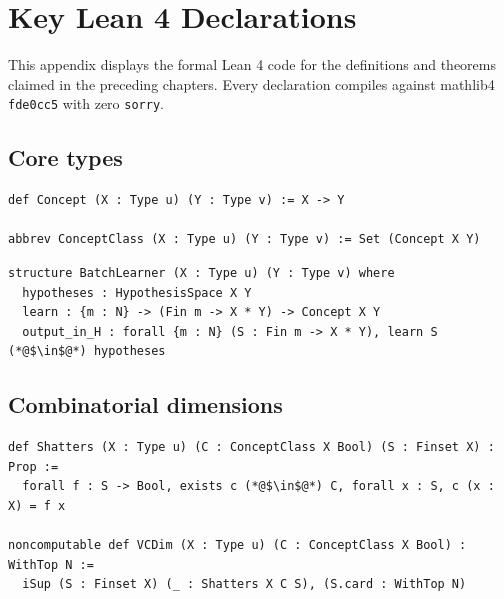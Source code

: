 %

\chapter{Key Lean 4 Declarations}\label{app:lean-code}

This appendix displays the formal Lean 4 code for the definitions and
theorems claimed in the preceding chapters. Every declaration compiles
against mathlib4 \texttt{fde0cc5} with zero \texttt{sorry}.

\section{Core types}

\begin{lstlisting}[caption={Concept and ConceptClass (Basic.lean)}]
def Concept (X : Type u) (Y : Type v) := X -> Y

abbrev ConceptClass (X : Type u) (Y : Type v) := Set (Concept X Y)
\end{lstlisting}

\begin{lstlisting}[caption={BatchLearner (Learner/Core.lean)}]
structure BatchLearner (X : Type u) (Y : Type v) where
  hypotheses : HypothesisSpace X Y
  learn : {m : N} -> (Fin m -> X * Y) -> Concept X Y
  output_in_H : forall {m : N} (S : Fin m -> X * Y), learn S (*@$\in$@*) hypotheses
\end{lstlisting}

\section{Combinatorial dimensions}

\begin{lstlisting}[caption={Shattering and VC dimension (Complexity/VCDimension.lean)}]
def Shatters (X : Type u) (C : ConceptClass X Bool) (S : Finset X) : Prop :=
  forall f : S -> Bool, exists c (*@$\in$@*) C, forall x : S, c (x : X) = f x

noncomputable def VCDim (X : Type u) (C : ConceptClass X Bool) : WithTop N :=
  iSup (S : Finset X) (_ : Shatters X C S), (S.card : WithTop N)
\end{lstlisting}

